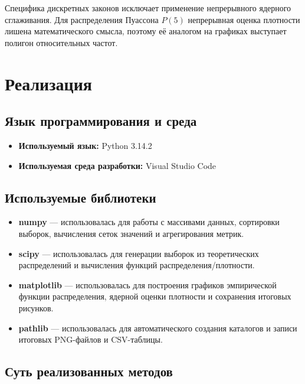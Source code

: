 \documentclass[a4paper, 14pt]{extarticle}
\begin{document}
Специфика дискретных законов исключает применение непрерывного ядерного сглаживания. Для распределения Пуассона $P(5)$ непрерывная оценка плотности лишена математического смысла, поэтому её аналогом на графиках выступает полигон относительных частот.

\section{Реализация}

\subsection{Язык программирования и среда}
    \begin{itemize}
        \item \textbf{Используемый язык:} Python 3.14.2
        \item \textbf{Используемая среда разработки:} Visual Studio Code
    \end{itemize}

\subsection{Используемые библиотеки}
    \begin{itemize}
        \item \textbf{numpy} --- использовалась для работы с массивами данных, сортировки выборок, вычисления сеток значений и агрегирования метрик.
        \item \textbf{scipy} --- использовалась для генерации выборок из теоретических распределений и вычисления функций распределения/плотности.
        \item \textbf{matplotlib} --- использовалась для построения графиков эмпирической функции распределения, ядерной оценки плотности и сохранения итоговых рисунков.
        \item \textbf{pathlib} --- использовалась для автоматического создания каталогов и записи итоговых PNG-файлов и CSV-таблицы.
    \end{itemize}

\subsection{Суть реализованных методов}
\end{document}
